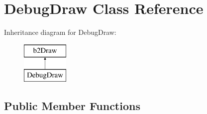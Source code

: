 \hypertarget{class_debug_draw}{\section{Debug\-Draw Class Reference}
\label{class_debug_draw}
}
Inheritance diagram for Debug\-Draw\-:\begin{figure}[H]
\begin{center}
\leavevmode
\includegraphics[height=2.000000cm]{class_debug_draw}
\end{center}
\end{figure}
\subsection*{Public Member Functions}

